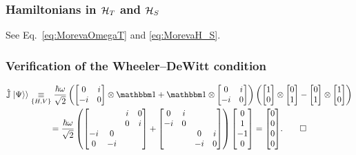 \subsubsection*{Hamiltonians in $\mathcal{H}_T$ and $\mathcal{H}_S$}

See Eq.~\eqref{eq:MorevaOmegaT} and \eqref{eq:MorevaH_S}.

\subsubsection*{Verification of the Wheeler--DeWitt condition}

\begin{multline}\label{eq:pw:moreva:WheelerDeWittVerification}
  \op{\mathbb{J}} \dket{\Psi}
  \repr[\setof{H, V}]
  \frac{\hbar\omega}{\sqrt{2}}
  \left(
    \left[\begin{matrix}0 & i\\- i & 0\end{matrix}\right]
    \ox
    \idop
    +
    \idop
    \ox
    \left[\begin{matrix}0 & i\\- i & 0\end{matrix}\right]
  \right)
  \left(
    \left[\begin{matrix}1\\0\end{matrix}\right] \ox \left[\begin{matrix}0\\1\end{matrix}\right]
    -
    \left[\begin{matrix}0\\1\end{matrix}\right] \ox \left[\begin{matrix}1\\0\end{matrix}\right]
  \right)
  \\
  =
  \frac{\hbar\omega}{\sqrt{2}}
  \left(
    \left[\begin{matrix}  &   & i & 0\\  &   & 0 & i\\- i & 0 &   &  \\0 & - i &   &  \end{matrix}\right]
    +
    \left[\begin{matrix}0 & i &   &  \\- i & 0 &   &  \\  &   & 0 & i\\  &   & - i & 0\end{matrix}\right]
  \right)
  \mqty[0 \\ 1 \\ -1 \\ 0]
  =
  \mqty[0 \\ 0 \\ 0 \\ 0]
  \text{.}
  \qed
\end{multline}


